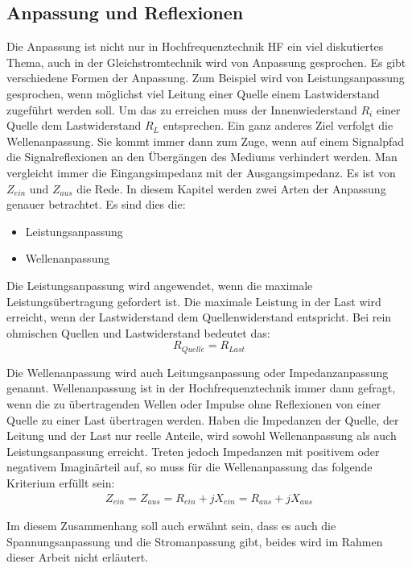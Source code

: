 \subsection{Anpassung und Reflexionen}
Die Anpassung ist nicht nur in Hochfrequenztechnik HF ein viel diskutiertes Thema, auch in der Gleichstromtechnik wird von Anpassung gesprochen. Es gibt verschiedene Formen der Anpassung. Zum Beispiel wird von Leistungsanpassung gesprochen, wenn möglichst viel Leitung einer Quelle einem Lastwiderstand zugeführt werden soll. Um das zu erreichen muss der Innenwiederstand  $R_i$ einer Quelle dem Lastwiderstand $R_L$ entsprechen.  Ein ganz anderes Ziel verfolgt die Wellenanpassung. Sie kommt immer dann zum Zuge, wenn auf einem Signalpfad die Signalreflexionen an den Übergängen des Mediums verhindert werden.
Man vergleicht immer die Eingangsimpedanz mit der Ausgangsimpedanz. Es ist  von $Z_{ein}$ und $Z_{aus}$ die Rede.
In diesem Kapitel werden zwei Arten der Anpassung genauer betrachtet. Es sind dies die:
\begin{itemize}
\item Leistungsanpassung
\item Wellenanpassung
\end{itemize}
Die Leistungsanpassung wird angewendet, wenn die maximale Leistungsübertragung gefordert ist. Die maximale Leistung in der Last wird erreicht, wenn der Lastwiderstand dem Quellenwiderstand entspricht. Bei rein ohmischen Quellen und Lastwiderstand bedeutet das:\\
\[R_{Quelle} = R_{Last}\]

Die Wellenanpassung wird auch Leitungsanpassung oder Impedanzanpassung genannt. Wellenanpassung ist in der Hochfrequenztechnik immer dann gefragt, wenn die zu übertragenden Wellen oder Impulse ohne Reflexionen von einer Quelle zu einer Last übertragen werden. Haben die Impedanzen der Quelle, der Leitung und der Last nur reelle Anteile, wird sowohl Wellenanpassung als auch Leistungsanpassung erreicht. Treten jedoch Impedanzen mit positivem oder negativem Imaginärteil auf, so muss für die Wellenanpassung das folgende Kriterium erfüllt sein: \\
\begin{eqnarray}\label{eq:ZeinZaus}
Z_{ein} = Z_{aus} = R_{ein} +jX_{ein} = R_{aus} + jX_{aus}
\end{eqnarray}

Im diesem Zusammenhang soll auch erwähnt sein, dass es auch die Spannungsanpassung und die Stromanpassung gibt, beides wird im Rahmen dieser Arbeit nicht erläutert. \\


